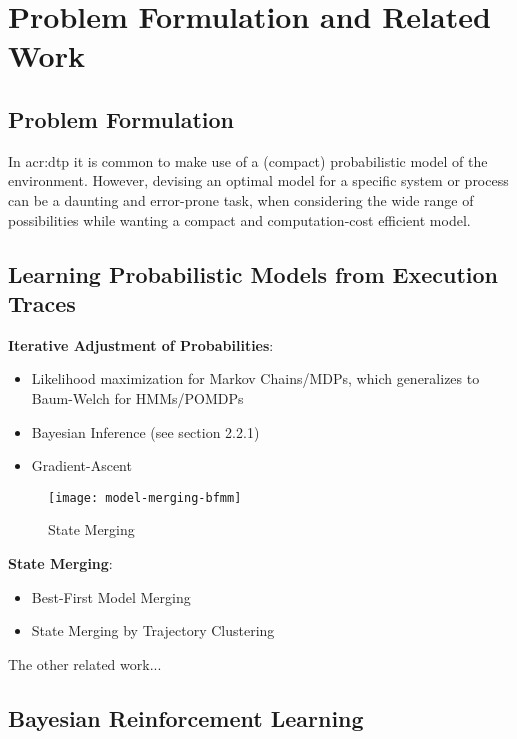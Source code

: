 \chapter{Problem Formulation and Related Work}
\label{ch:problem-related-work}

\section{Problem Formulation}
\label{sec:problem-formulation}

In \acrshort{acr:dtp} it is common to make use of a (compact) probabilistic model of the environment.
However, devising an optimal model for a specific system or process can be a daunting and error-prone task, when considering the wide range of possibilities while wanting a compact and computation-cost efficient model.

\section{Learning Probabilistic Models from Execution Traces}
\label{sec:learning-state-spaces}

\textbf{Iterative Adjustment of Probabilities}:
\begin{itemize}
	\item Likelihood maximization for Markov Chains/MDPs, which generalizes to Baum-Welch for HMMs/POMDPs
	\item Bayesian Inference (see section 2.2.1)
	\item Gradient-Ascent
\end{itemize}

\begin{figure}[]
	\centering
	\texttt{[image: model-merging-bfmm]}
	\caption{State Merging}
	\label{fig:state-merging}
\end{figure}

\noindent \textbf{State Merging}:
\begin{itemize}
	\item Best-First Model Merging \cite{stolcke1994best}
	\item State Merging by Trajectory Clustering \cite{nikovski2000learning}
\end{itemize}

\noindent The other related work...

\section{Bayesian Reinforcement Learning}
\label{sec:bayesian-reinforcement-learning}


